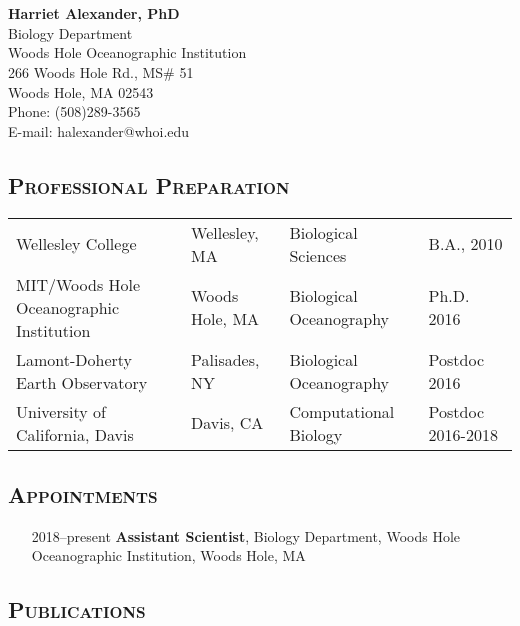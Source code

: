 \documentclass[svgnames,11pt]{article}
\date{}
\author{}
\let\origsection\section%
\let\section\subsubsection%
\let\section\origsection%
\begin{document}

\section*{}
\textbf{\large{Harriet Alexander, PhD}}\\
Biology Department\\
Woods Hole Oceanographic Institution\\
266 Woods Hole Rd., MS\# 51\\
Woods Hole, MA 02543\\
Phone: (508)289-3565\\
E-mail: halexander@whoi.edu\\


\subsection*{\textsc{Professional Preparation}}

\begin{tabular}{ l l l l }
 Wellesley College & Wellesley, MA & Biological Sciences & B.A., 2010 \\
 MIT/Woods Hole Oceanographic Institution  & Woods Hole, MA & Biological Oceanography & Ph.D. 2016 \\
 Lamont-Doherty Earth Observatory & Palisades, NY & Biological Oceanography & Postdoc 2016 \\
 University of California, Davis & Davis, CA & Computational Biology & Postdoc 2016-2018 \\
\end{tabular}

\subsection*{\textsc{Appointments}}

\begin{itemize}[label={--9999:},leftmargin=*,itemsep=0pt]

    \item[2018--present]
        \textbf{Assistant Scientist},
        Biology Department, Woods Hole Oceanographic Institution, Woods Hole, MA

\end{itemize}

\subsection*{\textsc{Publications}}
\end{document}
